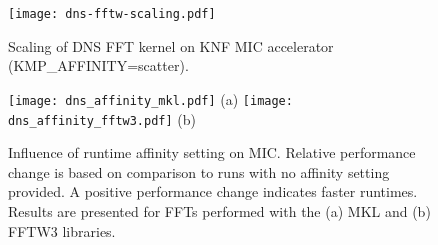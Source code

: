 \begin{figure}[h]
\begin{center}
\texttt{[image: dns-fftw-scaling.pdf]}
\end{center}
\vspace*{-.5cm}
\caption{Scaling of DNS FFT kernel on KNF MIC accelerator ({KMP\_AFFINITY=scatter}).}
\label{fig:dns_scaling}
\end{figure}

\begin{figure}[htp]
\begin{center}
\texttt{[image: dns\_affinity\_mkl.pdf]}
(a)
\texttt{[image: dns\_affinity\_fftw3.pdf]}
(b)
\end{center}
\vspace*{-.5cm}
\caption{Influence of runtime affinity setting on MIC.
  Relative performance change is based
  on comparison to runs with no affinity setting provided. A
  positive performance change indicates faster runtimes.  Results are
  presented for FFTs performed with the (a) MKL and (b) FFTW3
  libraries.}
\label{fig:dns_affinity}
\end{figure}




%

%
